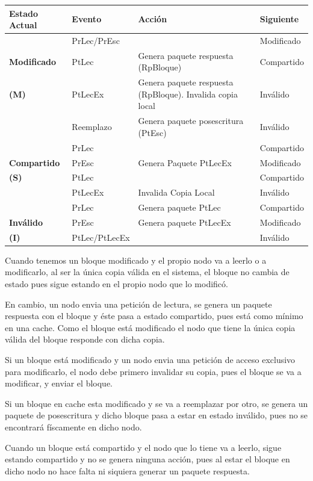 \documentclass[10pt,a4paper,spanish]{report}
\begin{document}
\begin{tabular}{|p{2.5cm}|p{2.2cm}|p{7cm}|p{2.5cm}|}
\hline
\textbf{Estado Actual} & \textbf{Evento} & \textbf{Acción} & \textbf{Siguiente} \\
\hline
& PrLec/PrEsc & & Modificado \\ \cline{2-4}
\textbf{Modificado} & PtLec & Genera paquete respuesta (RpBloque) & Compartido \\ \cline{2-4}
\textbf{(M)} & PtLecEx & Genera paquete respuesta (RpBloque). Invalida copia local & Inválido \\ \cline{2-4}
& Reemplazo & Genera paquete posescritura (PtEsc) & Inválido \\
\hline
& PrLec & & Compartido \\ \cline{2-4}
\textbf{Compartido} & PrEsc & Genera Paquete PtLecEx & Modificado \\ \cline{2-4}
\textbf{(S)} & PtLec & & Compartido \\ \cline{2-4}
& PtLecEx & Invalida Copia Local & Inválido \\
\hline
& PrLec & Genera paquete PtLec & Compartido \\ \cline{2-4}
\textbf{Inválido} & PrEsc & Genera paquete PtLecEx & Modificado \\ \cline{2-4}
\textbf{(I)} & PtLec/PtLecEx & & Inválido \\
\hline
\end{tabular}

Cuando tenemos un bloque modificado y el propio nodo va a leerlo o a modificarlo, al ser la única copia válida en el sistema, el bloque no cambia de estado pues sigue estando en el propio nodo que lo modificó.

En cambio, un nodo envia una petición de lectura, se genera un paquete respuesta con el bloque y éste pasa a estado compartido, pues está como mínimo en una cache. Como el bloque está modificado el nodo que tiene la única copia válida del bloque responde con dicha copia.

Si un bloque está modificado y un nodo envia una petición de acceso exclusivo para modificarlo, el nodo debe primero invalidar su copia, pues el bloque se va a modificar, y enviar el bloque.

Si un bloque en cache esta modificado y se va a reemplazar por otro, se genera un paquete de posescritura y dicho bloque pasa a estar en estado inválido, pues no se encontrará físcamente en dicho nodo.

Cuando un bloque está compartido y el nodo que lo tiene va a leerlo, sigue estando compartido y no se genera ninguna acción, pues al estar el bloque en dicho nodo no hace falta ni siquiera generar un paquete respuesta.
\end{document}
